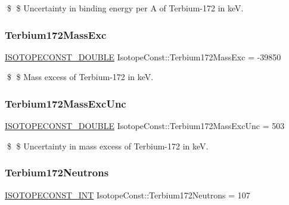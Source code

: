 \$ \$ Uncertainty in binding energy per A of Terbium-\/172 in keV. \mbox{\label{group___isotope_const-_terbium-_tb172_gac5a1f2f2fc361b63ab2640346ea832dd}} 
\subsubsection{\texorpdfstring{Terbium172\+Mass\+Exc}{Terbium172MassExc}}
{\footnotesize\ttfamily \mbox{\hyperlink{group___isotope_const-_macros_ga8f45a7272ce02c0b4c65c44636ed719a}{I\+S\+O\+T\+O\+P\+E\+C\+O\+N\+S\+T\+\_\+\+D\+O\+U\+B\+LE}} Isotope\+Const\+::\+Terbium172\+Mass\+Exc = -\/39850}

\$ \$ Mass excess of Terbium-\/172 in keV. \mbox{\label{group___isotope_const-_terbium-_tb172_gadcefc63699f4a81f891d9aeda5c6c6bf}} 
\subsubsection{\texorpdfstring{Terbium172\+Mass\+Exc\+Unc}{Terbium172MassExcUnc}}
{\footnotesize\ttfamily \mbox{\hyperlink{group___isotope_const-_macros_ga8f45a7272ce02c0b4c65c44636ed719a}{I\+S\+O\+T\+O\+P\+E\+C\+O\+N\+S\+T\+\_\+\+D\+O\+U\+B\+LE}} Isotope\+Const\+::\+Terbium172\+Mass\+Exc\+Unc = 503}

\$ \$ Uncertainty in mass excess of Terbium-\/172 in keV. \mbox{\label{group___isotope_const-_terbium-_tb172_gae812478c4d830c0d94ac95486ab28536}} 
\subsubsection{\texorpdfstring{Terbium172\+Neutrons}{Terbium172Neutrons}}
{\footnotesize\ttfamily \mbox{\hyperlink{group___isotope_const-_macros_ga5f18360b3e99483a35c32d789e62621c}{I\+S\+O\+T\+O\+P\+E\+C\+O\+N\+S\+T\+\_\+\+I\+NT}} Isotope\+Const\+::\+Terbium172\+Neutrons = 107}

